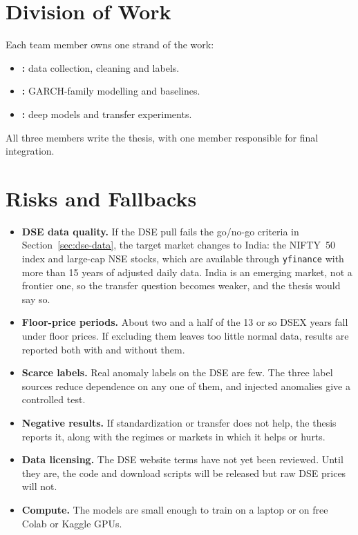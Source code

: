 \section{Division of Work}
Each team member owns one strand of the work:
\begin{itemize}
    \item \textbf{\StudentTwoName:} data collection, cleaning and labels.
    \item \textbf{\StudentThreeName:} GARCH-family modelling and baselines.
    \item \textbf{\StudentOneName:} deep models and transfer experiments.
\end{itemize}
All three members write the thesis, with one member responsible for final integration.

\section{Risks and Fallbacks}\label{sec:risks}
\begin{itemize}
    \item \textbf{DSE data quality.} If the DSE pull fails the go/no-go criteria in
    Section~\ref{sec:dse-data}, the target market changes to India: the NIFTY~50 index and large-cap NSE
    stocks, which are available through \texttt{yfinance} with more than 15 years of
    adjusted daily data. India is an emerging market, not a frontier one, so the transfer
    question becomes weaker, and the thesis would say so.
    \item \textbf{Floor-price periods.} About two and a half of the 13 or so DSEX years fall
    under floor prices. If excluding them leaves too little normal data, results are
    reported both with and without them.
    \item \textbf{Scarce labels.} Real anomaly labels on the DSE are few. The three label
    sources reduce dependence on any one of them, and injected anomalies give a controlled
    test.
    \item \textbf{Negative results.} If standardization or transfer does not help, the
    thesis reports it, along with the regimes or markets in which it helps or hurts.
    \item \textbf{Data licensing.} The DSE website terms have not yet been reviewed. Until
    they are, the code and download scripts will be released but raw DSE prices will not.
    \item \textbf{Compute.} The models are small enough to train on a laptop or on free
    Colab or Kaggle GPUs.
\end{itemize}

